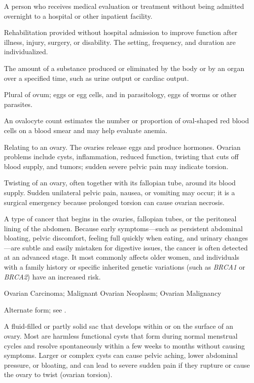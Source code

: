  A person who receives medical evaluation or treatment without being admitted overnight to a hospital or other inpatient facility.

 Rehabilitation provided without hospital admission to improve function after illness, injury,
surgery, or disability. The setting, frequency, and duration are individualized.

 The amount of a substance produced or eliminated by the body or by an organ over a specified time, such as urine output or cardiac output.

 Plural of ovum; eggs or egg cells, and in parasitology, eggs of worms or other parasites.

 An ovalocyte count estimates the number or proportion of oval-shaped red blood cells on a blood smear and may help evaluate anemia.

 Relating to an ovary. The ovaries release eggs and produce hormones. Ovarian problems include cysts, inflammation, reduced function, twisting that cuts off blood supply, and tumors; sudden severe pelvic pain may indicate torsion.

 Twisting of an ovary, often together with its fallopian tube, around its blood supply. Sudden unilateral pelvic pain, nausea, or vomiting may occur; it is a surgical emergency because prolonged torsion can cause ovarian necrosis.

 A type of cancer that begins in the ovaries, fallopian tubes, or the peritoneal lining of the abdomen. Because early symptoms—such as persistent abdominal bloating, pelvic discomfort, feeling full quickly when eating, and urinary changes—are subtle and easily mistaken for digestive issues, the cancer is often detected at an advanced stage. It most commonly affects older women, and individuals with a family history or specific inherited genetic variations (such as \textit{BRCA1} or \textit{BRCA2}) have an increased risk.

\synonyms
Ovarian Carcinoma; Malignant Ovarian Neoplasm; Ovarian Malignancy

 Alternate form; see .

 A fluid-filled or partly solid sac that develops within or on the surface of an ovary. Most are harmless functional cysts that form during normal menstrual cycles and resolve spontaneously within a few weeks to months without causing symptoms. Larger or complex cysts can cause pelvic aching, lower abdominal pressure, or bloating, and can lead to severe sudden pain if they rupture or cause the ovary to twist (ovarian torsion).

